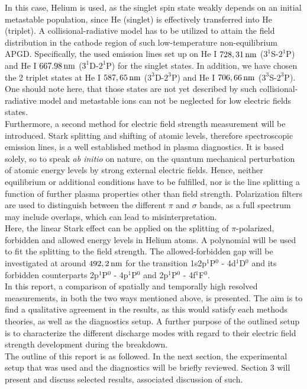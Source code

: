 \documentclass[a4paper,10pt,twoside]{article}
\newcommand{\tilt}[1]{\textit{#1}}
\begin{document}
		In this case, Helium is used, as the singlet spin state weakly depends on an initial metastable population, since He (singlet) is effectively transferred into He (triplet). A collisional-radiative model has to be utilized to attain the field distribution in the cathode region of such low-temperature non-equilibrium APGD. Specifically, the used emission lines set up on He I $\unit[728,31]{nm}$ ($3^1$S-$2^1$P) and He I $\unit[667.98]{nm}$ ($3^1$D-$2^1$P) for the singlet states. In addition, we have chosen the 2 triplet states at He I $\unit[587,65]{nm}$ ($3^3$D-$2^3$P) and He I $\unit[706,66]{nm}$ ($3^3$S-$2^3$P). One should note here, that those states are not yet described by such collisional-radiative model and metastable ions can not be neglected for low electric fields states.\\
		Furthermore, a second method for electric field \linebreak strength measurement will be introduced. Stark splitting and shifting of atomic levels, therefore spectroscopic emission lines, is a well established method in plasma diagnostics. It is based solely, so to speak \tilt{ab initio} on nature, on the quantum mechanical perturbation of atomic energy levels by strong external electric fields. Hence, neither equilibrium or additional conditions have to be fulfilled, nor is the line splitting a function of further plasma properties other than field strength. Polarization filters are used to distinguish between the different $\pi$ and $\sigma$ bands, as a full spectrum may include overlaps, which can lead to misinterpretation.\\
		Here, the linear Stark effect can be applied on the splitting of $\pi$-polarized, forbidden and allowed energy levels in Helium atoms. A polynomial will be used to fit the splitting to the field strength. The allowed-forbidden gap will be investigated at around $\unit[492,2]{nm}$ for the transition 1s2p$^1$P$^0$ - 4d$^1$D$^0$ and its forbidden counterparts 2p$^1$P$^0$ - 4p$^1$P$^0$ and 2p$^1$P$^0$ - 4f$^1$F$^0$.\\
		In this report, a comparison of spatially and temporally high resolved measurements, in both the two ways mentioned above, is presented. The aim is to find a qualitative agreement in the results, as this would satisfy each methods theories, as well as the diagnostics setup. A further purpose of the outlined setup is to characterize the different discharge modes with regard to their electric field strength development during the breakdown.\\
		The outline of this report is as followed. In the next section, the experimental setup that was used and the diagnostics will be briefly reviewed. Section 3 will present and discuss selected results, associated discussion of such.
\end{document}
